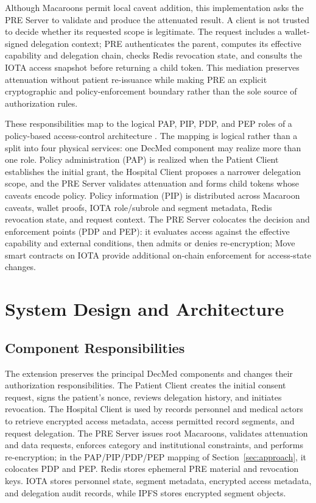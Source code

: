 \documentclass[conference,a4paper,english]{IEEEtran}
\begin{document}
Although Macaroons permit local caveat addition, this implementation asks the PRE Server to validate and produce the attenuated result. A client is not trusted to decide whether its requested scope is legitimate. The request includes a wallet-signed delegation context; PRE authenticates the parent, computes its effective capability and delegation chain, checks Redis revocation state, and consults the IOTA access snapshot before returning a child token. This mediation preserves attenuation without patient re-issuance while making PRE an explicit cryptographic and policy-enforcement boundary rather than the sole source of authorization rules.

These responsibilities map to the logical PAP, PIP, PDP, and PEP roles of a policy-based access-control architecture \cite{hu2014abac}. The mapping is logical rather than a split into four physical services: one DecMed component may realize more than one role. Policy administration (PAP) is realized when the Patient Client establishes the initial grant, the Hospital Client proposes a narrower delegation scope, and the PRE Server validates attenuation and forms child tokens whose caveats encode policy. Policy information (PIP) is distributed across Macaroon caveats, wallet proofs, IOTA role/subrole and segment metadata, Redis revocation state, and request context. The PRE Server colocates the decision and enforcement points (PDP and PEP): it evaluates access against the effective capability and external conditions, then admits or denies re-encryption; Move smart contracts on IOTA provide additional on-chain enforcement for access-state changes. \section{System Design and Architecture}
\label{sec:architecture}

\subsection{Component Responsibilities}

The extension preserves the principal DecMed components and changes their authorization responsibilities. The Patient Client creates the initial consent request, signs the patient's nonce, reviews delegation history, and initiates revocation. The Hospital Client is used by records personnel and medical actors to retrieve encrypted access metadata, access permitted record segments, and request delegation. The PRE Server issues root Macaroons, validates attenuation and data requests, enforces category and institutional constraints, and performs re-encryption; in the PAP/PIP/PDP/PEP mapping of Section~\ref{sec:approach}, it colocates PDP and PEP. Redis stores ephemeral PRE material and revocation keys. IOTA stores personnel state, segment metadata, encrypted access metadata, and delegation audit records, while IPFS stores encrypted segment objects.
\end{document}
